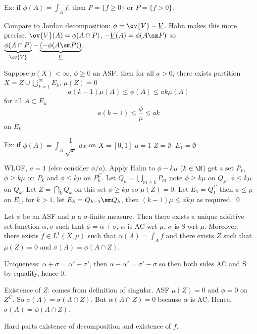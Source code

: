 Ex: if $\phi(A)= \int_A f$, then $P= \{ f \geq 0 \}$ or $P=\{ f>0 \}$. 

Compare to Jordan decomposition: $\phi= \ov{V} - \underline{V}$. Hahn makes this more precise. $\ov{V}(A)= \phi(A \cap P)$, $-\underline{V}(A)= \phi(A \sm P)$ so $\underbrace{\phi(A \cap P)}_{\ov{V}} - \underbrace{(- \phi(A \sm P))}_{\underline{V}}$.


\begin{lem}
Suppose $\mu(X)< \infty$, $\phi \geq 0$ an ASF, then for all $a>0$, there exists partition $X= Z \cup \bigcup_{k=1}^\infty E_k$, $\mu(Z)=0$
	\[
	a(k-1) \mu(A) \leq \phi(A) \leq a k \mu(A)
	\]
for all $A \subset E_k$
	\[
	a(k-1) \leq \dfrac{\phi}{\mu} \leq ak
	\]
on $E_k$
\end{lem}


Ex: if $\phi(A) = \int_A \dfrac{1}{\sqrt{x}} \; dx$ on $X=[0,1]$ $a=1$ $Z= \emptyset$, $E_1= \emptyset$


\pf WLOF, $a=1$ (else consider $\phi/a$). Apply Hahn to $\phi - k \mu$ ($k \in \N$) get a set $P_k$, $\phi \geq k \mu$ on $P_k$ and $\phi \leq k \mu$ on $P_k^C$. Let $Q_k= \bigcup_{m \geq k} P_m$ note $\phi \geq k \mu$ on $Q_k$, $\phi \leq k \mu$ on $Q_k$. Let $Z= \bigcap_k Q_k$ on this set $\phi \geq k \mu$ so $\mu(Z)=0$. Let $E_1= Q_1^C$ then $\phi \leq \mu$ on $E_1$, for $k>1$, let $E_k = Q_{k-1} \sm Q_k$, then $(k-1) \mu \leq \phi k \mu$ as required. \qed \\



\begin{thm}
Let $\phi$ be an ASF and $\mu$ a $\sigma$-finite measure. Then there exists a unique additive set function $\alpha,\sigma$ such that $\phi = \alpha + \sigma$, $\alpha$ is AC wrt $\mu$, $\sigma$ is S wrt $\mu$. Moreover, there exists $f \in L^1(X,\mu)$ such that $\alpha(A)= \int_A f$ and there exists $Z$ such that $\mu(Z)=0$ and $\sigma(A)= \phi(A \cap Z)$.
\end{thm}

\pf Uniqueness: $\alpha+\sigma= \alpha' + \sigma'$, then $\alpha-\alpha'= \sigma'-\sigma$ so then both sides AC and S by equality, hence 0. 



Existence of $Z$: comes from definition of singular. ASF $\mu(Z)=0$ and $\phi=0$ on $Z^C$. So $\sigma(A)= \sigma(A \cap Z)$. But $\alpha(A \cap Z)=0$ because $\alpha$ is AC. Hence, $\sigma(A)= \phi(A \cap Z)$. 

Hard parts existence of decomposition and existence of $f$. 








































